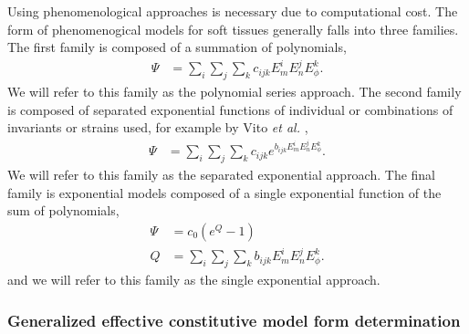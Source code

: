     Using phenomenological approaches is necessary due to computational cost. The form of phenomenogical models for soft tissues generally falls into three families. The first family is composed of a summation of polynomials, 
\begin{equation}
\begin{aligned}
\Psi	&= \sum_i\sum_j\sum_k c_{ijk}E_m^i E_n^j E_\phi^k. 
\end{aligned} \label{eqn:polynomialmodelform}
\end{equation}
We will refer to this family as the polynomial series approach. The second family is composed of separated exponential functions of individual or combinations of invariants or strains used, for example by Vito \textit{et al.} \cite{vito_mechanical_1980},
\begin{align}\label{eqn:vitomodelforms}
\Psi 	&= \sum_i\sum_j\sum_k c_{ijk} e^{b_{ijk}E_m^i E_n^j E_\phi^k}.
\end{align}
We will refer to this family as the separated exponential approach. The final family is exponential models composed of a single exponential function of the sum of polynomials,
\begin{equation}
\begin{aligned}\label{eqn:exponentialmodelform}
\Psi 	&= c_0 \left(e^{Q} - 1\right) \\
Q		&= \sum_i\sum_j\sum_k b_{ijk}E_m^i E_n^j E_\phi^k.
\end{aligned}
\end{equation}
and we will refer to this family as the single exponential approach. 


\subsubsection{Generalized effective constitutive model form determination} \label{sec:possibleforms}

